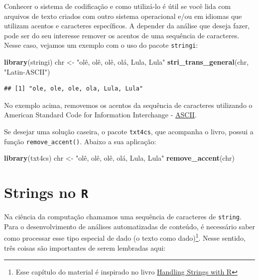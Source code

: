 \documentclass[]{book}
\newenvironment{Shaded}{\begin{snugshade}}{\end{snugshade}}
\newcommand{\KeywordTok}[1]{\textcolor[rgb]{0.13,0.29,0.53}{\textbf{#1}}}
\newcommand{\NormalTok}[1]{#1}
\newcommand{\StringTok}[1]{\textcolor[rgb]{0.31,0.60,0.02}{#1}}
\begin{document}
Conhecer o sistema de codificação e como utilizá-lo é útil se você lida com arquivos de texto criados com outro sistema operacional e/ou em idiomas que utilizam acentos e caracteres específicos. A depender da análise que deseja fazer, pode ser do seu interesse remover os acentos de uma sequência de caracteres. Nesse caso, vejamos um exemplo com o uso do pacote \texttt{stringi}:

\begin{Shaded}
\begin{Highlighting}[]
\KeywordTok{library}\NormalTok{(stringi)}
\NormalTok{chr <-}\StringTok{ "olê, olê, olê, olá, Lula, Lula"}
\KeywordTok{stri_trans_general}\NormalTok{(chr, }\StringTok{"Latin-ASCII"}\NormalTok{)}
\end{Highlighting}
\end{Shaded}

\begin{verbatim}
## [1] "ole, ole, ole, ola, Lula, Lula"
\end{verbatim}

No exemplo acima, removemos os acentos da sequência de caracteres utilizando o
American Standard Code for Information Interchange - \href{https://en.wikipedia.org/wiki/ASCII}{ASCII}.

Se desejar uma solução caseira, o pacote \texttt{txt4cs}, que acompanha o livro, possui a função \texttt{remove\_accent()}. Abaixo a sua aplicação:

\begin{Shaded}
\begin{Highlighting}[]
\KeywordTok{library}\NormalTok{(txt4cs)}
\NormalTok{chr <-}\StringTok{ "olê, olê, olê, olá, Lula, Lula"}
\KeywordTok{remove_accent}\NormalTok{(chr)}
\end{Highlighting}
\end{Shaded}

\hypertarget{stringR}{%
\chapter{\texorpdfstring{Strings no \texttt{R}}{Strings no R}}\label{stringR}}

Na ciência da computação chamamos uma sequência de caracteres de \texttt{string}. Para
o desenvolvimento de análises automatizadas de conteúdo, é necessário saber como processar esse tipo especial de dado (o texto como dado)\footnote{Esse capítulo do material é inspirado no livro \href{https://www.gastonsanchez.com/r4strings/}{Handling Strings with R}}. Nesse sentido, três coisas são importantes de serem lembradas aqui:
\end{document}
